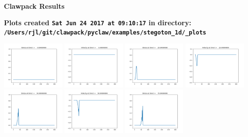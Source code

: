\documentclass[11pt]{article}
\begin{document}
        \begin{center}{\Large\bf Clawpack Results}\vskip 5pt
        
        \bf Plots created {\tt Sat Jun 24 2017 at 09:10:17} in directory: \vskip 5pt
        \verb+/Users/rjl/git/clawpack/pyclaw/examples/stegoton_1d/_plots+
        \end{center}
        \vskip 5pt
        \includegraphics[width=0.2375\textwidth]{frame0000fig1.png}
\includegraphics[width=0.2375\textwidth]{frame0000fig2.png}
\includegraphics[width=0.2375\textwidth]{frame0001fig1.png}
\includegraphics[width=0.2375\textwidth]{frame0001fig2.png}
\vskip 10pt 
\includegraphics[width=0.2375\textwidth]{frame0002fig1.png}
\includegraphics[width=0.2375\textwidth]{frame0002fig2.png}
\includegraphics[width=0.2375\textwidth]{frame0003fig1.png}
\end{document}
